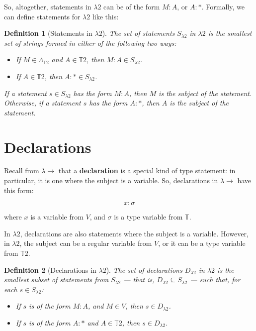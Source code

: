 \documentclass{book}
\numberwithin{equation}{chapter}
\newcommand{\vocab}{\textbf}
\newtheorem{definition}{Definition}
\begin{document}
\noindent
So, altogether, statements in $\lambda 2$ can be of the form $M : A$, or $A : *$. Formally, we can define statements for $\lambda 2$ like this:

\begin{definition}[Statements in $\lambda 2$]
The set of statements $S_{\lambda2}$ in $\lambda 2$ is the smallest set of strings formed in either of the following two ways:

\begin{itemize}
\item{If $M \in \Lambda_{\mathbb{T}2}$ and $A \in \mathbb{T}2$, then $M : A \in S_{\lambda2}$.}
\item{If $A \in \mathbb{T}2$, then $A : * \in S_{\lambda2}$.}
\end{itemize}

\noindent
If a statement $s \in S_{\lambda2}$ has the form $M : A$, then $M$ is the subject of the statement. Otherwise, if a statement $s$ has the form $A : *$, then $A$ is the subject of the statement.

\end{definition}



\section{Declarations}

Recall from $\lambda \rightarrow$ that a \vocab{declaration} is a special kind of type statement: in particular, it is one where the subject is a variable. So, declarations in $\lambda \rightarrow$ have this form:

\begin{equation}
x : \sigma
\end{equation}

\noindent
where $x$ is a variable from $V$, and $\sigma$ is a type variable from $\mathbb{T}$. 

In $\lambda 2$, declarations are also statements where the subject is a variable. However, in $\lambda 2$, the subject can be a regular variable from $V$, or it can be a type variable from $\mathbb{T}2$.

\begin{definition}[Declarations in $\lambda 2$]
The set of declarations $D_{\lambda2}$ in $\lambda 2$ is the smallest subset of statements from $S_{\lambda2}$ --- that is, $D_{\lambda2} \subseteq S_{\lambda2}$ --- such that, for each $s \in S_{\lambda 2}$:

\begin{itemize}
\item{If $s$ is of the form $M : A$, and $M \in V$, then  $s \in D_{\lambda2}$.}
\item{If $s$ is of the form $A : *$ and $A \in \mathbb{T}2$, then $s \in D_{\lambda2}$.}
\end{itemize}
\end{definition}
\end{document}
